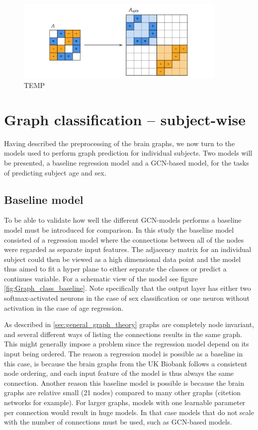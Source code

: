 \begin{figure}[H]
    \centering
    \includegraphics[width=0.9\textwidth]{chapters/images_methods/split.png}
    \caption{TEMP}
    \label{fig:block_diagonal_adjacency_matrix}
\end{figure}

\section{Graph classification -- subject-wise}

Having described the preprocessing of the brain graphs, we now turn to the models used to perform graph prediction for individual subjects. Two models will be presented, a baseline regression model and a GCN-based model, for the tasks of predicting subject age and sex.

\subsection{Baseline model}
To be able to validate how well the different GCN-models performs a baseline model must be introduced for comparison. In this study the baseline model consisted of a regression model where the connections between all of the nodes were regarded as separate input features. The adjacency matrix for an individual subject could then be viewed as a high dimensional data point and the model thus aimed to fit a hyper plane to either separate the classes or predict a continues variable. For a schematic view of the model see figure \ref{fig:Graph_class_baseline}. Note specifically that the output layer has either two softmax-activated neurons in the case of sex classification or one neuron without activation in the case of age regression. 

As described in \ref{sec:general_graph_theory} graphs are completely node invariant, and several different ways of listing the connections results in the same graph. This might generally impose a problem since the regression model depend on its input being ordered. The reason a regression model is possible as a baseline in this case, is because the brain graphs from the UK Biobank follows a consistent node ordering, and each input feature of the model is thus always the same connection. Another reason this baseline model is possible is because the brain graphs are relative small (21 nodes) compared to many other graphs (citetion networks for example). For larger graphs, models with one learnable parameter per connection would result in huge models. In that case models that do not scale with the number of connections must be used, such as GCN-based models. 

